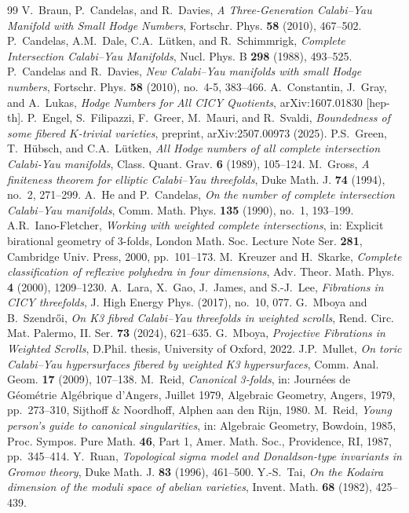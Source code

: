 \documentclass[11pt]{article}
\begin{document}
	\begin{thebibliography}{99}
		 V.~Braun, P.~Candelas, and R.~Davies, \emph{A Three-Generation Calabi--Yau Manifold with Small Hodge Numbers}, Fortschr. Phys. \textbf{58} (2010), 467--502.
		 P.~Candelas, A.M.~Dale, C.A.~L\"utken, and R.~Schimmrigk, \emph{Complete Intersection Calabi--Yau Manifolds}, Nucl. Phys. B \textbf{298} (1988), 493--525.
		 P.~Candelas and R.~Davies, \emph{New Calabi--Yau manifolds with small Hodge numbers}, Fortschr. Phys. \textbf{58} (2010), no.~4-5, 383--466.
		 A.~Constantin, J.~Gray, and A.~Lukas, \emph{Hodge Numbers for All CICY Quotients}, arXiv:1607.01830 [hep-th].
		 P.~Engel, S.~Filipazzi, F.~Greer, M.~Mauri, and R.~Svaldi, \emph{Boundedness of some fibered $K$-trivial varieties}, preprint, arXiv:2507.00973 (2025).
		 P.S.~Green, T.~H\"ubsch, and C.A.~L\"utken, \emph{All Hodge numbers of all complete intersection Calabi-Yau manifolds}, Class. Quant. Grav. \textbf{6} (1989), 105--124.
		 M.~Gross, \emph{A finiteness theorem for elliptic Calabi--Yau threefolds}, Duke Math. J. \textbf{74} (1994), no.~2, 271--299.
		 A.~He and P.~Candelas, \emph{On the number of complete intersection Calabi--Yau manifolds}, Comm. Math. Phys. \textbf{135} (1990), no.~1, 193--199.
		 A.R.~Iano-Fletcher, \emph{Working with weighted complete intersections}, in: Explicit birational geometry of 3-folds, London Math. Soc. Lecture Note Ser. \textbf{281}, Cambridge Univ. Press, 2000, pp.~101--173.
		 M.~Kreuzer and H.~Skarke, \emph{Complete classification of reflexive polyhedra in four dimensions}, Adv. Theor. Math. Phys. \textbf{4} (2000), 1209--1230.
		 A.~Lara, X.~Gao, J.~James, and S.-J.~Lee, \emph{Fibrations in CICY threefolds}, J. High Energy Phys. (2017), no.~10, 077.
		 G.~Mboya and B.~Szendr\H{o}i, \emph{On K3 fibred Calabi--Yau threefolds in weighted scrolls}, Rend. Circ. Mat. Palermo, II. Ser. \textbf{73} (2024), 621--635.
		 G.~Mboya, \emph{Projective Fibrations in Weighted Scrolls}, D.Phil. thesis, University of Oxford, 2022.
		 J.P.~Mullet, \emph{On toric Calabi--Yau hypersurfaces fibered by weighted K3 hypersurfaces}, Comm. Anal. Geom. \textbf{17} (2009), 107--138.
		 M.~Reid, \emph{Canonical 3-folds}, in: Journ\'ees de G\'eom\'etrie Alg\'ebrique d'Angers, Juillet 1979, Algebraic Geometry, Angers, 1979, pp.~273--310, Sijthoff \& Noordhoff, Alphen aan den Rijn, 1980.
		 M.~Reid, \emph{Young person's guide to canonical singularities}, in: Algebraic Geometry, Bowdoin, 1985, Proc. Sympos. Pure Math. \textbf{46}, Part 1, Amer. Math. Soc., Providence, RI, 1987, pp.~345--414.
		 Y.~Ruan, \emph{Topological sigma model and Donaldson-type invariants in Gromov theory}, Duke Math. J. \textbf{83} (1996), 461--500.
		 Y.-S.~Tai, \emph{On the Kodaira dimension of the moduli space of abelian varieties}, Invent. Math. \textbf{68} (1982), 425--439.
	\end{thebibliography}
	
\end{document}
